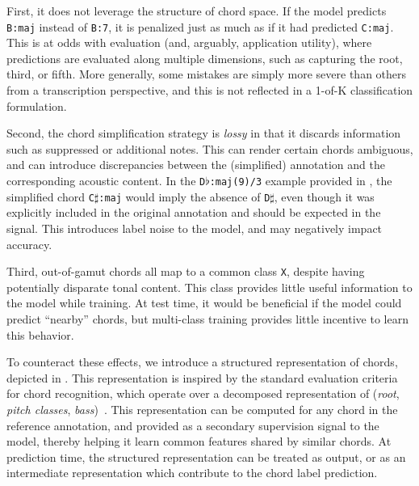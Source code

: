 \documentclass{article}
\begin{document}
First, it does not leverage the structure of chord space.
If the model predicts \texttt{B:maj} instead of \texttt{B:7}, it is penalized just as much as if it had predicted \texttt{C:maj}.
This is at odds with evaluation (and, arguably, application utility), where predictions are evaluated along multiple dimensions, such as capturing the root, third, or fifth.
More generally, some mistakes are simply more severe than others from a transcription perspective, and this is not reflected in a 1-of-K classification formulation.

Second, the chord simplification strategy is \emph{lossy} in that it discards information such as suppressed or additional notes.
This can render certain chords ambiguous, and can introduce discrepancies between the (simplified) annotation and the corresponding acoustic content.
In the \texttt{D}$\flat$\texttt{:maj{(9)}/3} example provided in , the simplified chord \texttt{C}$\sharp$\texttt{:maj} would imply the absence of \texttt{D}$\sharp$, even though it was explicitly included in the original annotation and should be expected in the signal.
This introduces label noise to the model, and may negatively impact accuracy.

Third, out-of-gamut chords all map to a common class \texttt{X}, despite having potentially disparate tonal content.
This class provides little useful information to the model while training.
At test time, it would be beneficial if the model could predict ``nearby'' chords, but multi-class training provides little incentive to learn this behavior.


To counteract these effects, we introduce a structured representation of chords, depicted in .
This representation is inspired by the standard evaluation criteria for chord recognition, which operate over a decomposed representation of (\emph{root}, \emph{pitch classes}, \emph{bass})~\cite{raffel2014mir_eval}.
This representation can be computed for any chord in the reference annotation, and provided as a secondary supervision signal to the model, thereby helping it learn common features shared by similar chords.
At prediction time, the structured representation can be treated as output, or as an intermediate representation which contribute to the chord label prediction.
\end{document}
